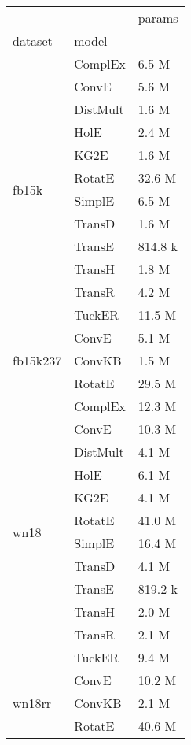 \begin{tabular}{lll}
\toprule
       &        &   params \\
dataset & model &          \\
\midrule
\multirow{12}{*}{fb15k} & ComplEx &    6.5 M \\
       & ConvE &    5.6 M \\
       & DistMult &    1.6 M \\
       & HolE &    2.4 M \\
       & KG2E &    1.6 M \\
       & RotatE &   32.6 M \\
       & SimplE &    6.5 M \\
       & TransD &    1.6 M \\
       & TransE &  814.8 k \\
       & TransH &    1.8 M \\
       & TransR &    4.2 M \\
       & TuckER &   11.5 M \\
\cline{1-3}
\multirow{3}{*}{fb15k237} & ConvE &    5.1 M \\
       & ConvKB &    1.5 M \\
       & RotatE &   29.5 M \\
\cline{1-3}
\multirow{12}{*}{wn18} & ComplEx &   12.3 M \\
       & ConvE &   10.3 M \\
       & DistMult &    4.1 M \\
       & HolE &    6.1 M \\
       & KG2E &    4.1 M \\
       & RotatE &   41.0 M \\
       & SimplE &   16.4 M \\
       & TransD &    4.1 M \\
       & TransE &  819.2 k \\
       & TransH &    2.0 M \\
       & TransR &    2.1 M \\
       & TuckER &    9.4 M \\
\cline{1-3}
\multirow{3}{*}{wn18rr} & ConvE &   10.2 M \\
       & ConvKB &    2.1 M \\
       & RotatE &   40.6 M \\
\bottomrule
\end{tabular}

